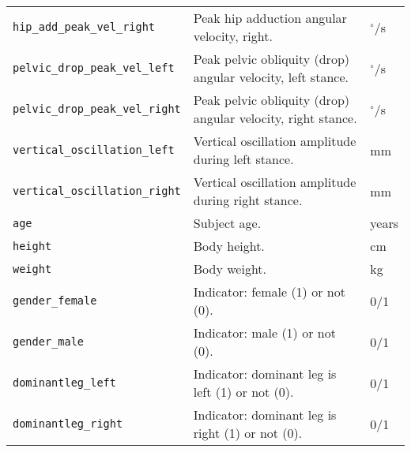 \begin{longtable}{@{}l p{} l@{}}
    \texttt{hip\_add\_peak\_vel\_right} & Peak hip adduction angular velocity, right. & $^\circ$/s \\
    \texttt{pelvic\_drop\_peak\_vel\_left} & Peak pelvic obliquity (drop) angular velocity, left stance. & $^\circ$/s \\
    \texttt{pelvic\_drop\_peak\_vel\_right} & Peak pelvic obliquity (drop) angular velocity, right stance. & $^\circ$/s \\
    \texttt{vertical\_oscillation\_left} & Vertical oscillation amplitude during left stance. & mm \\
    \texttt{vertical\_oscillation\_right} & Vertical oscillation amplitude during right stance. & mm \\
    \texttt{age} & Subject age. & years \\
    \texttt{height} & Body height. & cm \\
    \texttt{weight} & Body weight. & kg \\
    \texttt{gender\_female} & Indicator: female (1) or not (0). & 0/1 \\
    \texttt{gender\_male} & Indicator: male (1) or not (0). & 0/1 \\
    \texttt{dominantleg\_left} & Indicator: dominant leg is left (1) or not (0). & 0/1 \\
    \texttt{dominantleg\_right} & Indicator: dominant leg is right (1) or not (0). & 0/1 \\
\end{longtable}

